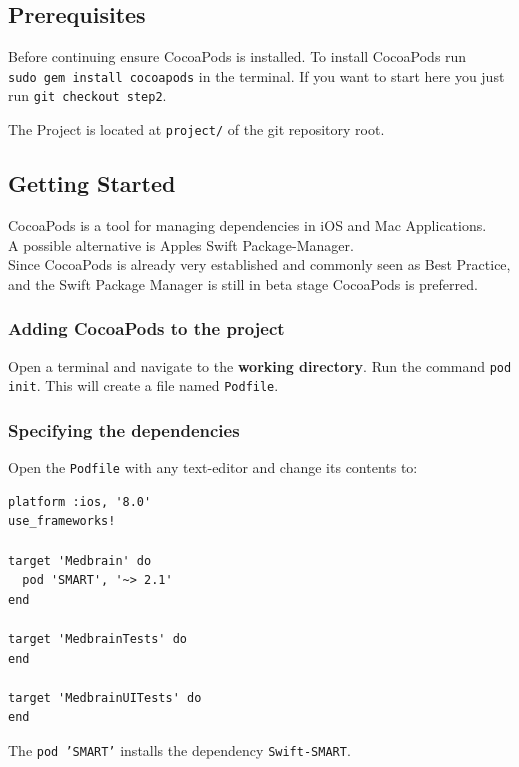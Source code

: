 \documentclass{article}
\begin{document}
\subsection{Prerequisites}\label{step2:prerequisites}

Before continuing ensure CocoaPods is installed.
To install CocoaPods run \texttt{sudo\ gem\ install\ cocoapods} in the terminal.
\newline
If you want to start here you just run \texttt{git\ checkout\ step2}.

The Project is located at \texttt{project/} of the git repository root.

\subsection{Getting Started}\label{step2:getting-started}

CocoaPods\citep{cocoapods} is a tool for managing dependencies in iOS and Mac Applications.
\\
A possible alternative is Apples Swift Package-Manager\citep{swift-package-manager}.
\\
Since CocoaPods is already very established and commonly seen as Best
Practice, and the Swift Package Manager is still in beta
stage CocoaPods is preferred.


\subsubsection{Adding CocoaPods to the project}
Open a terminal and navigate to the \textbf{working directory}.
Run the command \texttt{pod init}.
This will create a file named \texttt{Podfile}.

\subsubsection{Specifying the dependencies}
Open the \texttt{Podfile} with any text-editor and change its contents to:

\begin{verbatim}
platform :ios, '8.0'
use_frameworks!

target 'Medbrain' do
  pod 'SMART', '~> 2.1'
end

target 'MedbrainTests' do
end

target 'MedbrainUITests' do
end
\end{verbatim}

The \texttt{pod\ 'SMART'} installs the dependency \texttt{Swift-SMART}\citep{swift-smart}.
\end{document}
